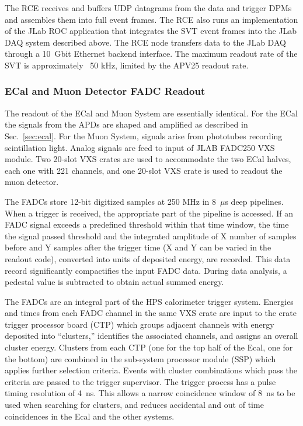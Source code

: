 The RCE receives and buffers UDP datagrams from the data and trigger DPMs and
 assembles them into full event frames. The RCE also runs an implementation of the JLab ROC application 
that integrates the SVT event frames into the JLab DAQ 
 system described above. The RCE node transfers data to the JLab DAQ  
 through a 10~Gbit Ethernet backend interface. The maximum readout rate of the SVT is approximately 
~50 kHz, limited by the APV25 readout rate. 










\subsubsection{ECal and Muon Detector FADC Readout}
\label{sec:fadc_daq}
The readout of the ECal and Muon System are essentially identical. For the ECal the signals from the APDs are 
shaped and amplified as described in Sec.~\ref{sec:ecal}. For the Muon System, signals arise from phototubes recording scintillation light.
Analog signals are feed to input of JLAB FADC250 VXS module. Two 20-slot VXS crates are used to accommodate the two ECal 
halves, each one with 221 channels, and one 20-slot VXS crate is used to readout the muon 
detector. 

The FADCs store 12-bit digitized samples at 250 MHz in 8~$\mu$s deep pipelines. 
When a trigger is received, the appropriate part of the pipeline is accessed. If an FADC   
signal exceeds a predefined threshold within that time window, the time the signal passed threshold and the integrated
amplitude of X number of samples before and Y samples after the trigger time (X and Y can be varied in the readout code), 
converted into units of deposited energy, are recorded. This data record significantly compactifies the  
input FADC data. During data analysis, a pedestal value is subtracted to obtain actual summed energy.

The FADCs are an integral part of the HPS calorimeter trigger system. Energies  
and times from each FADC channel in the same VXS crate are input to the crate trigger
processor board (CTP) which groups adjacent channels with energy deposited into ``clusters,'' identifies the associated channels, and
assigns an overall cluster energy. Clusters  
from each CTP (one for the top half of the Ecal, one for the bottom) are combined in the sub-system processor module (SSP) 
which applies further selection criteria. Events with cluster combinations which pass the criteria are
passed to the trigger supervisor. The trigger process has a pulse timing resolution of 4~ns. This allows a narrow 
coincidence window of 8~ns to be used when searching for clusters, and reduces accidental and out of time coincidences in the Ecal
and the other systems. 





